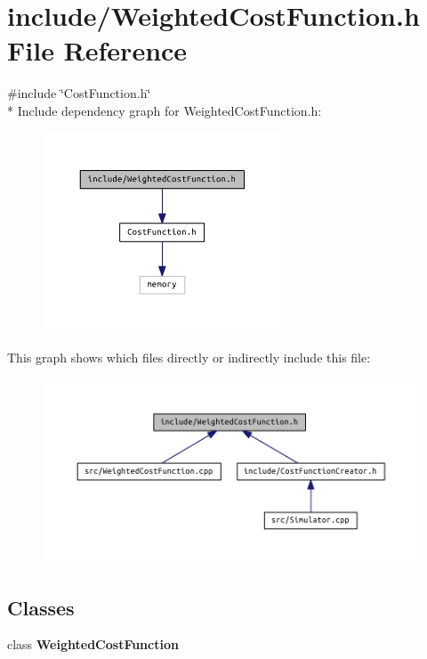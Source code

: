 \section{include/\+Weighted\+Cost\+Function.h File Reference}
\label{_weighted_cost_function_8h}
{\ttfamily \#include \char`\"{}Cost\+Function.\+h\char`\"{}}\\*
Include dependency graph for Weighted\+Cost\+Function.\+h\+:
\nopagebreak
\begin{figure}[H]
\begin{center}
\leavevmode
\includegraphics[width=202pt]{_weighted_cost_function_8h__incl}
\end{center}
\end{figure}
This graph shows which files directly or indirectly include this file\+:
\nopagebreak
\begin{figure}[H]
\begin{center}
\leavevmode
\includegraphics[width=350pt]{_weighted_cost_function_8h__dep__incl}
\end{center}
\end{figure}
\subsection*{Classes}
\begin{DoxyCompactItemize}
\item 
class {\bf Weighted\+Cost\+Function}
\end{DoxyCompactItemize}
